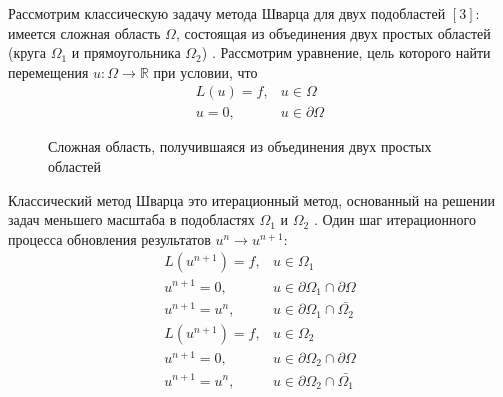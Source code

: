 \documentclass[a4paper, 14pt]{extarticle}
\begin{document}
Рассмотрим классическую задачу метода Шварца для двух подобластей $\left[3\right]$: имеется сложная область $\Omega$, состоящая из объединения двух простых областей (круга $\Omega_1$ и прямоугольника $\Omega_2$) \cite{2}. Рассмотрим уравнение, цель которого найти перемещения $u: \Omega \rightarrow \mathbb{R}$ при условии, что
\begin{equation*}
\begin{array}{rl}
L(u) = f, & u \in \Omega \\
u = 0, & u \in \partial \Omega
\end{array}
\end{equation*}

\begin{figure}[h]
\caption{Сложная область, получившаяся из объединения двух простых областей}
\label{fig:image_01}
\end{figure}

Классический метод Шварца это итерационный метод, основанный на решении задач меньшего масштаба в подобластях $\Omega_1$ и $\Omega_2$ \cite{3}. Один шаг итерационного процесса обновления результатов $u^n \rightarrow u^{n+1}$:
\begin{eqnarray*}
L (u^{n+1}) = f, & u \in \Omega_1 \\
u^{n+1} = 0, & u \in \partial \Omega_1 \cap \partial \Omega \\
u^{n+1} = u^n, & u \in \partial \Omega_1 \cap \bar{\Omega_2}
\end{eqnarray*}
\begin{eqnarray*}
L (u^{n+1}) = f, & u \in \Omega_2 \\
u^{n+1} = 0, & u \in \partial \Omega_2 \cap \partial \Omega \\
u^{n+1} = u^n, & u \in \partial \Omega_2 \cap \bar{\Omega_1}
\end{eqnarray*}
\end{document}
